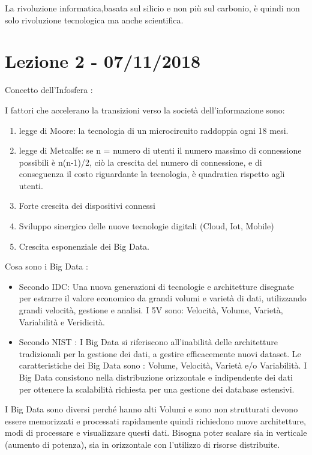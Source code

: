 \documentclass[]{article}
\begin{document}
La rivoluzione informatica,basata sul silicio e non più sul carbonio,
è quindi non solo rivoluzione tecnologica ma anche scientifica.

\section*{Lezione 2 - 07/11/2018}

Concetto dell'Infosfera :

I fattori che accelerano la transizioni verso la società
dell'informazione sono:

\begin{enumerate}
	\def\labelenumi{\arabic{enumi}.}
	 
	\item
	legge di Moore: la tecnologia di un microcircuito raddoppia ogni 18
	mesi.
	\item
	legge di Metcalfe: se n = numero di utenti il numero massimo di
	connessione possibili è n(n-1)/2, ciò la crescita del numero di
	connessione, e di conseguenza il costo riguardante la tecnologia, è
	quadratica rispetto agli utenti.
	\item
	Forte crescita dei dispositivi connessi
	\item
	Sviluppo sinergico delle nuove tecnologie digitali (Cloud, Iot,
	Mobile)
	\item
	Crescita esponenziale dei Big Data.
\end{enumerate}

Cosa sono i Big Data :

\begin{itemize}
	 
	\item
	Secondo IDC: Una nuova generazioni di tecnologie e architetture
	disegnate per estrarre il valore economico da grandi volumi e varietà
	di dati, utilizzando grandi velocità, gestione e analisi. I 5V sono:
	Velocità, Volume, Varietà, Variabilità e Veridicità.
	\item
	Secondo NIST : I Big Data si riferiscono all'inabilità delle
	architetture tradizionali per la gestione dei dati, a gestire
	efficacemente nuovi dataset. Le caratteristiche dei Big Data sono :
	Volume, Velocità, Varietà e/o Variabilità. I Big Data consistono nella
	distribuzione orizzontale e indipendente dei dati per ottenere la
	scalabilità richiesta per una gestione dei database estensivi. 
\end{itemize}


I Big Data sono diversi perché hanno alti Volumi e sono non strutturati
devono essere memorizzati e processati rapidamente quindi richiedono
nuove architetture, modi di processare e visualizzare questi dati.
Bisogna poter scalare sia in verticale (aumento di potenza),
sia in orizzontale con l'utilizzo di risorse distribuite.
\end{document}
